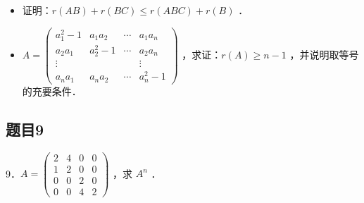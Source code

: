 \documentclass{article}
\begin{document}
\begin{itemize}
  \item[（1）] 证明：\(r(A B)+r(B C) \leq r(A B C)+r(B)\) ．
  \item[（2）] \(A=\left(\begin{array}{cccc}a_{1}^{2}-1 & a_{1} a_{2} & \cdots & a_{1} a_{n} \\ a_{2} a_{1} & a_{2}^{2}-1 & \cdots & a_{2} a_{n} \\ \vdots & & & \vdots \\ a_{n} a_{1} & a_{n} a_{2} & \cdots & a_{n}^{2}-1\end{array}\right)\) ，求证：\(r(A) \geq n-1\) ，并说明取等号的充要条件．
\end{itemize}

\subsection{题目9}
9．\(A=\left(\begin{array}{llll}2 & 4 & 0 & 0 \\ 1 & 2 & 0 & 0 \\ 0 & 0 & 2 & 0 \\ 0 & 0 & 4 & 2\end{array}\right)\) ，求 \(A^{n}\) ．
\end{document}
